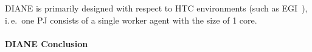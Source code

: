 \documentclass{sig-alternate}
\begin{document}
DIANE is primarily designed with respect to HTC environments (such as
EGI~\cite{egi}), i.\,e.\ one PJ consists of a single worker agent with the
size of 1 core.

\paragraph{DIANE Conclusion}





\end{document}
